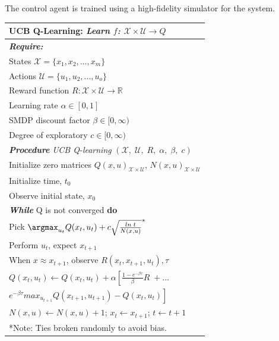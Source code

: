 The control agent is trained using a high-fidelity simulator for the system.
\begin{table}[h]
    \begin{center}
	\def\arraystretch{1.05}
	\begin{tabular}{p{9cm}}
	\hline
	\textbf{UCB Q-Learning:} \emph{Learn $f$: $\mathcal{X} \times \mathcal{U} \rightarrow Q$} \\ \hline
	
		\textbf{\textit{Require:}} \\
	    States ${\mathcal{X}} = \{x_1, x_2, ..., x_m\}$ \\
	    Actions ${\mathcal{U}} = \{u_1, u_2, ..., u_o\}$ \\
	    Reward function $R: {\mathcal{X}} \times {\mathcal{U}} \rightarrow {\mathbb{R}}$ \\
	    Learning rate $\alpha \in [0, 1]$ \\
	    SMDP discount factor $\beta \in [0, \infty)$ \\
	    Degree of exploratory $c \in [0, \infty)$ \\
		\textbf{\textit{Procedure}} \textit{UCB Q-learning} $({\mathcal{X},\; \mathcal{U}},\; R, \; \alpha, \; \beta, \; c)$ \\
		\hspace{0.25cm} Initialize zero matrices $Q(x, u)_{{\mathcal{X}} \times
		{\mathcal{U}}}$, $N(x, u)_{{\mathcal{X}} \times {\mathcal{U}}}$ \\
		\hspace{0.25cm} Initialize time, $t_0$ \\
		\hspace{0.25cm} Observe initial state, $x_0$ \\
		\hspace{0.25cm} \textbf{\textit{While}} Q is not converged \textbf{do} \\
		\hspace{0.5cm} Pick $\argmax_{u_t} Q(x_t,u_t) + c \sqrt{\frac{ln \; t}{N(x, u)}} ^*$ \\
		\hspace{0.5cm} Perform $u_t$, expect $x_{t+1}$ \\
		\hspace{0.5cm} When $x \approx x_{t+1}$, observe $R(x_t, x_{t+1}, u_t), \tau$ \\
        \hspace{0.5cm} $Q(x_t, u_t) \leftarrow Q(x_t, u_t) + \alpha \left[\frac{1 - e^{-\beta \tau}}{\beta}R \; + ... \right.$ \\
        \hspace{1.7cm} $\left. e^{-\beta \tau} max_{u_{t+1}} Q(x_{t+1}, u_{t+1}) - Q(x_t, u_t) \right]$ \\
		\hspace{0.5cm} $N(x, u) \leftarrow N(x, u) + 1$; \; $x_t \leftarrow x_{t+1}$; \; $t \leftarrow t + 1$ \\ \hline
		*Note: Ties broken randomly to avoid bias.
	\end{tabular}
	\end{center}
\end{table}

